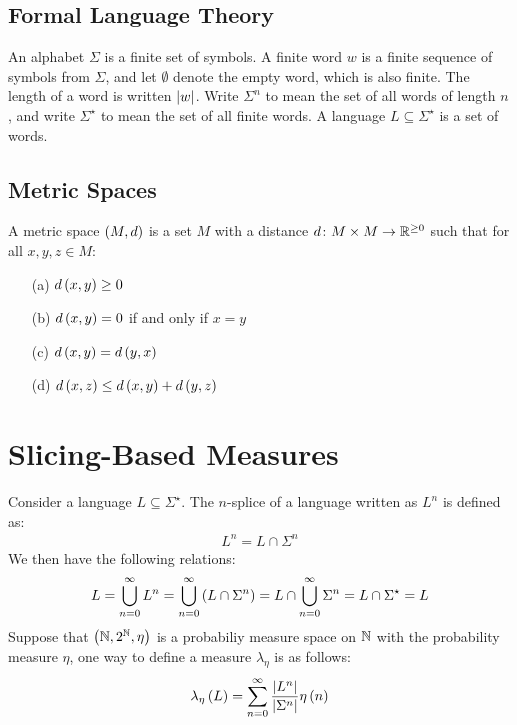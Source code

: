 \documentclass[12pt]{article}
\begin{document}
\subsection{Formal Language Theory}
An alphabet \(\Sigma\) is a finite set of symbols.
A finite word \(w\) is a finite sequence of symbols from \(\Sigma\),
and let \(\emptyset\) denote the empty word, which is also finite.
The length of a word is written \(\left\lvert w\right\rvert\).
Write \(\Sigma^n\) to mean the set of all words of length \(n\),
and write \(\Sigma^\star\) to mean the set of all finite words.
A language \(L \subseteq \Sigma^\star\) is a set of words.


\subsection{Metric Spaces}
A metric space \(\left(M, d\right)\) is a set \(M\) with a distance
\(d \colon M \times M \to \mathbb{R}^{\geq 0}\) such that
for all \(x, y, z \in M\):
\begin{enumerate}
  \item[(a)]
    \(d\left(x, y\right) \geq 0\)

  \item[(b)]
    \(d\left(x, y\right) = 0\) if and only if \(x = y\)

  \item[(c)]
    \(d\left(x, y\right) = d\left(y, x\right)\)

  \item[(d)]
    \(d\left(x, z\right) \leq d\left(x, y\right) + d\left(y, z\right)\)
\end{enumerate}


\section{Slicing-Based Measures}
Consider a language \(L \subseteq \Sigma^\star\).
The \(n\)-splice of a language written as \(L^n\) is defined as:
\begin{align*}
  L^n = L \cap \Sigma^n
\end{align*}
We then have the following relations:
\begin{align*}
  L
    = \bigcup_{n = 0}^{\infty} L^n
    = \bigcup_{n = 0}^{\infty} \left(L \cap \Sigma^n\right)
    = L \cap \bigcup_{n = 0}^{\infty} \Sigma^n
    = L \cap \Sigma^\star
    = L
\end{align*}
Suppose that \(\left(\mathbb{N}, 2^{\mathbb{N}}, \eta\right)\) is a probabiliy measure space
on \(\mathbb{N}\) with the probability measure \(\eta\),
one way to define a measure \(\lambda_{\eta}\)
is as follows:
\begin{align*}
  \lambda_{\eta} \left(L\right)
    = \sum_{n = 0}^{\infty}
        \frac{\left\lvert L^n\right\rvert}{\left\lvert\Sigma^n\right\rvert} \eta\left(n\right)
\end{align*}
\end{document}
